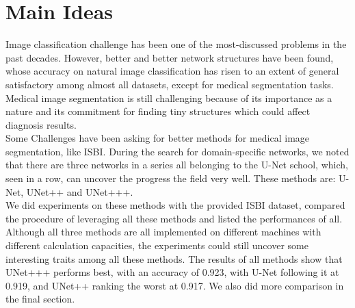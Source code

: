 \section{Main Ideas}
Image classification challenge has been one of the most-discussed problems in the past decades. However, better and better network structures have been found, whose accuracy on natural image classification has risen to an extent of general satisfactory among almost all datasets, except for medical segmentation tasks. Medical image segmentation is still challenging because of its importance as a nature and its commitment for finding tiny structures which could affect diagnosis results.\\

Some Challenges have been asking for better methods for medical image segmentation, like ISBI. During the search for domain-specific networks, we noted that there are three networks in a series all belonging to the U-Net school, which, seen in a row, can uncover the progress the field very well. These methods are: U-Net, UNet++ and UNet+++.\\

We did experiments on these methods with the provided ISBI dataset, compared the procedure of leveraging all these methods and listed the performances of all. Although all three methods are all implemented on different machines with different calculation capacities, the experiments could still uncover some interesting traits among all these methods. The results of all methods show that UNet+++ performs best, with an accuracy of 0.923, with U-Net following it at 0.919, and UNet++ ranking the worst at 0.917. We also did more comparison in the final section.
